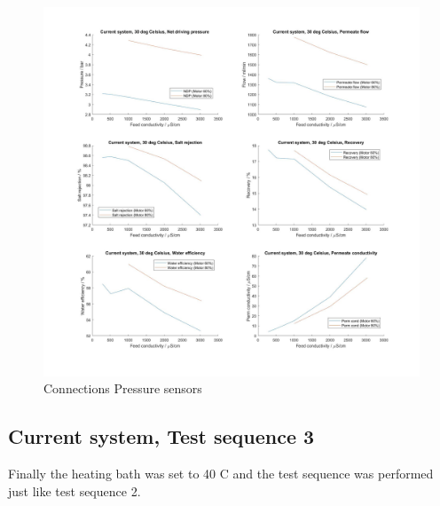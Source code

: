 \begin{figure}[H]
    \centering
    \includegraphics[width=1.1\textwidth]{Key30}
    \caption{Connections Pressure sensors}
    \label{fig:PressConn}
\end{figure}

\newpage

\subsection{Current system, Test sequence 3}

Finally the heating bath was set to 40 C and the test sequence was performed just like test sequence 2. 

